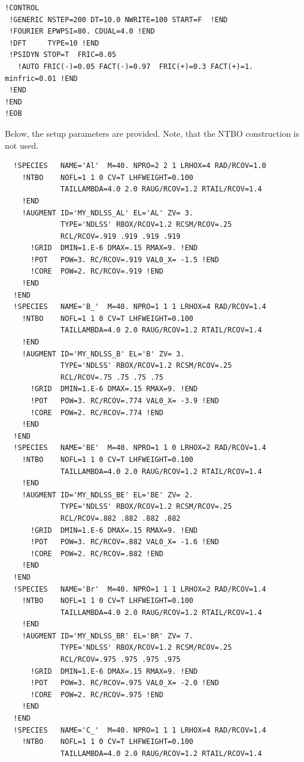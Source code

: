 \documentclass{book}
\begin{document}
{\tiny
\begin{verbatim}
!CONTROL
 !GENERIC NSTEP=200 DT=10.0 NWRITE=100 START=F  !END 
 !FOURIER EPWPSI=80. CDUAL=4.0 !END
 !DFT     TYPE=10 !END 
 !PSIDYN STOP=T  FRIC=0.05 
   !AUTO FRIC(-)=0.05 FACT(-)=0.97  FRIC(+)=0.3 FACT(+)=1. minfric=0.01 !END
 !END
!END
!EOB 
\end{verbatim}
}

Below, the setup parameters are provided. Note, that the NTBO
construction is not used.
{\tiny
\begin{verbatim}
  !SPECIES   NAME='Al'  M=40. NPRO=2 2 1 LRHOX=4 RAD/RCOV=1.0
    !NTBO    NOFL=1 1 0 CV=T LHFWEIGHT=0.100
             TAILLAMBDA=4.0 2.0 RAUG/RCOV=1.2 RTAIL/RCOV=1.4 
    !END 
    !AUGMENT ID='MY_NDLSS_AL' EL='AL' ZV= 3.
             TYPE='NDLSS' RBOX/RCOV=1.2 RCSM/RCOV=.25
             RCL/RCOV=.919 .919 .919 .919
      !GRID  DMIN=1.E-6 DMAX=.15 RMAX=9. !END
      !POT   POW=3. RC/RCOV=.919 VAL0_X= -1.5 !END
      !CORE  POW=2. RC/RCOV=.919 !END
    !END
  !END
  !SPECIES   NAME='B_'  M=40. NPRO=1 1 1 LRHOX=4 RAD/RCOV=1.4
    !NTBO    NOFL=1 1 0 CV=T LHFWEIGHT=0.100
             TAILLAMBDA=4.0 2.0 RAUG/RCOV=1.2 RTAIL/RCOV=1.4 
    !END 
    !AUGMENT ID='MY_NDLSS_B' EL='B' ZV= 3.
             TYPE='NDLSS' RBOX/RCOV=1.2 RCSM/RCOV=.25
             RCL/RCOV=.75 .75 .75 .75
      !GRID  DMIN=1.E-6 DMAX=.15 RMAX=9. !END
      !POT   POW=3. RC/RCOV=.774 VAL0_X= -3.9 !END
      !CORE  POW=2. RC/RCOV=.774 !END
    !END
  !END
  !SPECIES   NAME='BE'  M=40. NPRO=1 1 0 LRHOX=2 RAD/RCOV=1.4
    !NTBO    NOFL=1 1 0 CV=T LHFWEIGHT=0.100
             TAILLAMBDA=4.0 2.0 RAUG/RCOV=1.2 RTAIL/RCOV=1.4 
    !END 
    !AUGMENT ID='MY_NDLSS_BE' EL='BE' ZV= 2.
             TYPE='NDLSS' RBOX/RCOV=1.2 RCSM/RCOV=.25
             RCL/RCOV=.882 .882 .882 .882
      !GRID  DMIN=1.E-6 DMAX=.15 RMAX=9. !END
      !POT   POW=3. RC/RCOV=.882 VAL0_X= -1.6 !END
      !CORE  POW=2. RC/RCOV=.882 !END
    !END
  !END
  !SPECIES   NAME='Br'  M=40. NPRO=1 1 1 LRHOX=2 RAD/RCOV=1.4
    !NTBO    NOFL=1 1 0 CV=T LHFWEIGHT=0.100
             TAILLAMBDA=4.0 2.0 RAUG/RCOV=1.2 RTAIL/RCOV=1.4 
    !END 
    !AUGMENT ID='MY_NDLSS_BR' EL='BR' ZV= 7.
             TYPE='NDLSS' RBOX/RCOV=1.2 RCSM/RCOV=.25
             RCL/RCOV=.975 .975 .975 .975
      !GRID  DMIN=1.E-6 DMAX=.15 RMAX=9. !END
      !POT   POW=3. RC/RCOV=.975 VAL0_X= -2.0 !END
      !CORE  POW=2. RC/RCOV=.975 !END
    !END
  !END
  !SPECIES   NAME='C_'  M=40. NPRO=1 1 1 LRHOX=4 RAD/RCOV=1.4
    !NTBO    NOFL=1 1 0 CV=T LHFWEIGHT=0.100
             TAILLAMBDA=4.0 2.0 RAUG/RCOV=1.2 RTAIL/RCOV=1.4 

\end{verbatim}}
\end{document}
